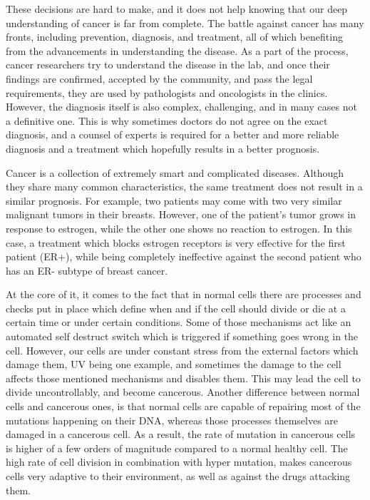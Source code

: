 These decisions are hard to make, and it does not help knowing that our deep
understanding of cancer is far from complete. The battle against cancer has
many fronts, including prevention, diagnosis, and treatment, all of which
benefiting from the advancements in understanding the disease. As a part of the
process, cancer researchers try to understand the disease in the lab, and once
their findings are confirmed, accepted by the community, and pass the legal
requirements, they are used by pathologists and oncologists in the clinics.
However, the diagnosis itself is also complex, challenging, and in many cases
not a definitive one. This is why sometimes doctors do not agree on the exact
diagnosis, and a counsel of experts is required for a better and more reliable
diagnosis and a treatment which hopefully results in a better prognosis.

Cancer is a collection of extremely smart and complicated diseases. Although
they share many common characteristics, the same treatment does not result in a
similar prognosis. For example, two patients may come with two very similar
malignant tumors in their breasts. However, one of the patient's tumor grows in
response to estrogen, while the other one shows no reaction to estrogen. In
this case, a treatment which blocks estrogen receptors is very effective for
the first patient (ER+), while being completely ineffective against the second
patient who has an ER- subtype of breast cancer.

At the core of it, it comes to the fact that in normal cells there are
processes and checks put in place which define when and if the cell should
divide or die at a certain time or under certain conditions. Some of those
mechanisms act like an automated self destruct switch which is triggered if
something goes wrong in the cell. However, our cells are under constant stress
from the external factors which damage them, UV being one example, and
sometimes the damage to the cell affects those mentioned mechanisms and
disables them. This may lead the cell to divide uncontrollably, and become
cancerous. Another difference between normal cells and cancerous ones, is that
normal cells are capable of repairing most of the mutations happening on their
DNA, whereas those processes themselves are damaged in a cancerous cell. As a
result, the rate of mutation in cancerous cells is higher of a few orders of
magnitude compared to a normal healthy cell. The high rate of cell division in
combination with hyper mutation, makes cancerous cells very adaptive to their
environment, as well as against the drugs attacking them.

